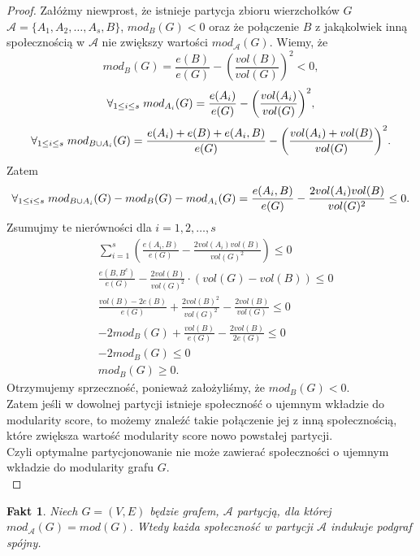 \documentclass[letterpaper,12pt]{article}
\newtheorem{fact}{Fakt}
\begin{document}
\begin{proof}
  Załóżmy niewprost, że istnieje partycja zbioru wierzchołków \(G\) \(\mathcal{A} = \{A_1, A_2, \ldots, A_s, B\}\), \(mod_B(G) < 0\) oraz że połączenie \(B\) z jakąkolwiek inną społecznością w \(\mathcal{A}\) nie zwiększy wartości \(mod_{\mathcal{A}}(G)\). Wiemy, że
  \[mod_B(G) = \frac{e(B)}{e(G)} - {\left(\frac{vol(B)}{vol(G)}\right)}^2 < 0,\]
  \[\forall_{1 \leq i \leq s} \hspace{1mm} mod_{A_i}(G) = \frac{e(A_i)}{e(G)} - {\left(\frac{vol(A_i)}{vol(G)}\right)}^2,\]
  \[\forall_{1 \leq i \leq s} \hspace{1mm} mod_{B \cup A_i}(G) = \frac{e(A_i)+e(B)+e(A_i, B)}{e(G)} - {\left(\frac{vol(A_i)+vol(B)}{vol(G)}\right)}^2.\]
  Zatem
  \[\forall_{1 \leq i \leq s} \hspace{1mm} mod_{B \cup A_i}(G)-mod_B(G)-mod_{A_i}(G) = \frac{e(A_i, B)}{e(G)} - \frac{2vol(A_i)vol(B)}{vol(G)^2} \leq 0.\]
  Zsumujmy te nierówności dla \(i=1, 2, \ldots, s\)
  \begin{align*}
     & \sum_{i=1}^{s} \left(\frac{e(A_i, B)}{e(G)} - \frac{2vol(A_i)vol(B)}{vol(G)^2} \right) \leq 0 \\
     & \frac{e(B, B^c)}{e(G)} - \frac{2vol(B)}{vol(G)^2} \cdot (vol(G)-vol(B)) \leq 0                \\
     & \frac{vol(B)-2e(B)}{e(G)} + \frac{2vol(B)^2}{vol(G)^2} - \frac{2vol(B)}{vol(G)} \leq 0        \\
     & -2mod_B(G) + \frac{vol(B)}{e(G)} - \frac{2vol(B)}{2e(G)} \leq 0                               \\
     & -2mod_B(G) \leq 0                                                                             \\
     & mod_B(G) \geq 0.
  \end{align*}
  Otrzymujemy sprzeczność, ponieważ założyliśmy, że \(mod_B(G) < 0\).\\
  Zatem jeśli w dowolnej partycji istnieje społeczność o ujemnym wkładzie do modularity score, to możemy znaleźć takie połączenie jej z inną społecznością, które zwiększa wartość modularity score nowo powstałej partycji.\\
  Czyli optymalne partycjonowanie nie może zawierać społeczności o ujemnym wkładzie do modularity grafu \(G\).\\
\end{proof}

\begin{fact}
  Niech \(G = (V,E)\) będzie grafem, \(\mathcal{A}\) partycją, dla której \(mod_{\mathcal{A}}(G) = mod(G)\). Wtedy każda społeczność w partycji \(\mathcal{A}\) indukuje podgraf spójny.
\end{fact}
\end{document}
